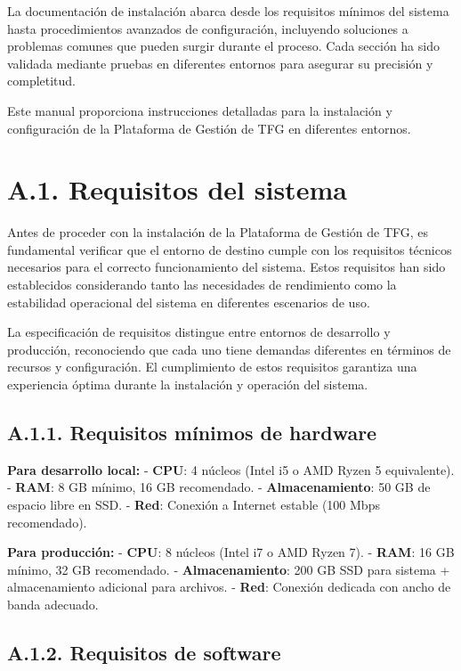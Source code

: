 \documentclass[12pt,a4paper,oneside]{report}
\begin{document}
{La documentación de instalación abarca desde los requisitos mínimos del
sistema hasta procedimientos avanzados de configuración, incluyendo
soluciones a problemas comunes que pueden surgir durante el proceso.
Cada sección ha sido validada mediante pruebas en diferentes entornos
para asegurar su precisión y completitud.

Este manual proporciona instrucciones detalladas para la instalación y
configuración de la Plataforma de Gestión de TFG en diferentes entornos.

\section{A.1. Requisitos del sistema}\label{a.1.-requisitos-del-sistema}

Antes de proceder con la instalación de la Plataforma de Gestión de TFG,
es fundamental verificar que el entorno de destino cumple con los
requisitos técnicos necesarios para el correcto funcionamiento del
sistema. Estos requisitos han sido establecidos considerando tanto las
necesidades de rendimiento como la estabilidad operacional del sistema
en diferentes escenarios de uso.

La especificación de requisitos distingue entre entornos de desarrollo y
producción, reconociendo que cada uno tiene demandas diferentes en
términos de recursos y configuración. El cumplimiento de estos
requisitos garantiza una experiencia óptima durante la instalación y
operación del sistema.

\subsection{A.1.1. Requisitos mínimos de
hardware}\label{a.1.1.-requisitos-muxednimos-de-hardware}

\textbf{Para desarrollo local:} - \textbf{CPU}: 4 núcleos (Intel i5 o
AMD Ryzen 5 equivalente). - \textbf{RAM}: 8 GB mínimo, 16 GB
recomendado. - \textbf{Almacenamiento}: 50 GB de espacio libre en SSD. -
\textbf{Red}: Conexión a Internet estable (100 Mbps recomendado).

\textbf{Para producción:} - \textbf{CPU}: 8 núcleos (Intel i7 o AMD
Ryzen 7). - \textbf{RAM}: 16 GB mínimo, 32 GB recomendado. -
\textbf{Almacenamiento}: 200 GB SSD para sistema + almacenamiento
adicional para archivos. - \textbf{Red}: Conexión dedicada con ancho de
banda adecuado.

\subsection{A.1.2. Requisitos de
software}\label{a.1.2.-requisitos-de-software}

}
\end{document}
